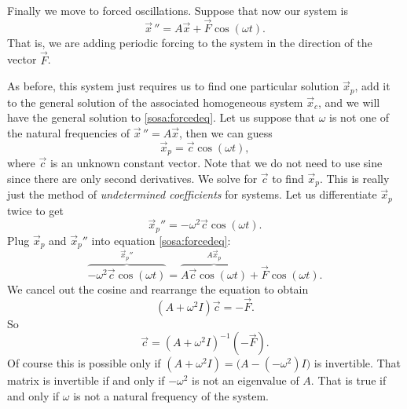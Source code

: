 \documentclass[12pt]{book}
\begin{document}
Finally we move to forced oscillations.
Suppose that now our system is
\begin{equation} \label{sosa:forcedeq}
{\vec{x}\,}'' = A \vec{x} + \vec{F} \cos ( \omega t) .
\end{equation}
That is, we are adding periodic forcing to the system in the direction of
the vector $\vec{F}$.

As before, this system just requires us to find one particular solution
$\vec{x}_p$, add it to the general solution of the associated homogeneous system
$\vec{x}_c$, and we will have the general solution to \eqref{sosa:forcedeq}.
Let us suppose that $\omega$ is not one of the natural frequencies of
${\vec{x}\,}'' = A \vec{x}$, then we can guess
\begin{equation*}
\vec{x}_p = \vec{c} \cos (\omega t) ,
\end{equation*}
where $\vec{c}$ is an unknown constant vector.  Note that we do not need
to use sine since there are only second derivatives.  We solve for $\vec{c}$ to
find $\vec{x}_p$.  This is really just the method of
\emph{undetermined coefficients}
for systems.  Let us differentiate $\vec{x}_p$ twice to get
\begin{equation*}
{\vec{x}_p{}\!}'' = -\omega^2 \vec{c} \cos (\omega t) .
\end{equation*}
Plug $\vec{x}_p$ and ${\vec{x}_p{}\!}''$ into equation \eqref{sosa:forcedeq}:
\begin{equation*}
\overbrace{
-\omega^2 \vec{c} \cos (\omega t)
}^{{\vec{x}_p{}\!}''}
=
\overbrace{
A \vec{c} \cos (\omega t) 
}^{A \vec{x}_p}
+ \vec{F} \cos (\omega t) .
\end{equation*}
We cancel out the cosine and rearrange the equation to obtain
\begin{equation*}
(A +\omega^2 I) \vec{c}
=
- \vec{F} .
\end{equation*}
So
\begin{equation*}
\vec{c}
=
{(A +\omega^2 I)}^{-1}
(-\vec{F} ).
\end{equation*}
Of course this is possible only if
$(A+ \omega^2 I) = \bigl(A- (-\omega^2) I\bigr)$ is
invertible.  That matrix is invertible if and only if
$-\omega^2$ is not an eigenvalue of $A$.  That is true if and only if $\omega$
is not a natural frequency of the system.
\end{document}
